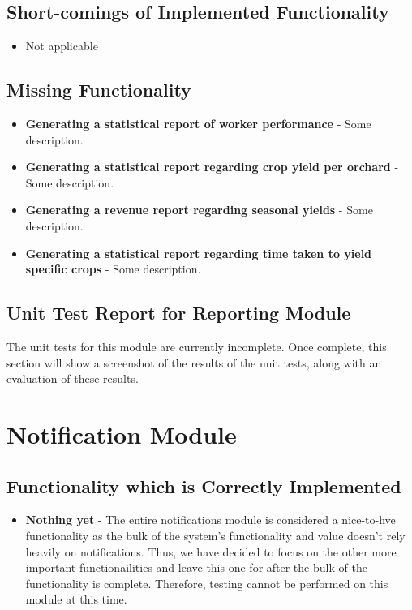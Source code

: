 \documentclass[11pt,fleqn]{book} %
\begin{document}
		\subsection{Short-comings of Implemented Functionality}
			\begin{itemize}
				\item{Not applicable}
			\end{itemize}
		\subsection{Missing Functionality}
			\begin{itemize}
				\item\textbf{Generating a statistical report of worker performance} -
				Some description.
				
				\item\textbf{Generating a statistical report regarding crop yield per orchard} -
				Some description.
				
				\item\textbf{Generating a revenue report regarding seasonal yields} -
				Some description.
				
				\item\textbf{Generating a statistical report regarding time taken to yield specific crops} -
				Some description.
			\end{itemize}
		\subsection{Unit Test Report for Reporting Module}
			The unit tests for this module are currently incomplete. Once complete, this section will show a screenshot of the results of the unit tests, along with an evaluation of these results.
			
	\section{Notification Module}
		\subsection{Functionality which is Correctly Implemented}
			\begin{itemize}
				\item\textbf{Nothing yet} -
				The entire notifications module is considered a nice-to-hve functionality as the bulk of the system's functionality and value doesn't rely heavily on notifications. Thus, we have decided to focus on the other more important functionailities and leave this one for after the bulk of the functionality is complete. Therefore, testing cannot be performed on this module at this time.
			\end{itemize}
\end{document}
